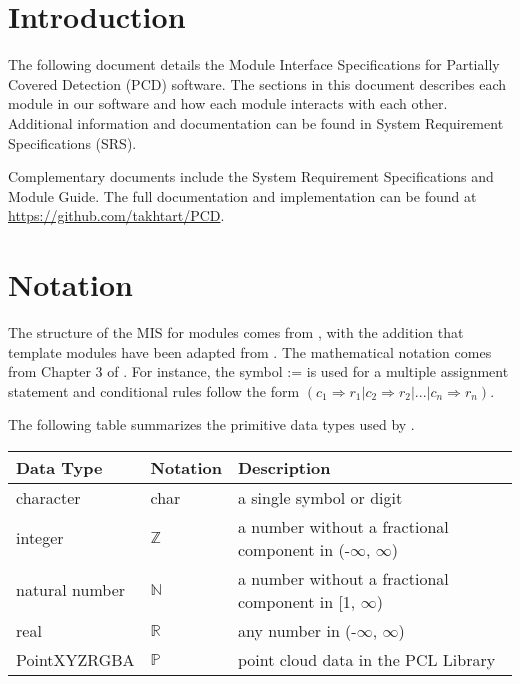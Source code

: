 \documentclass[12pt, titlepage]{article}
\begin{document}
\section{Introduction}

The following document details the Module Interface Specifications for Partially Covered Detection (PCD) software. 
The sections in this document describes each module in our software and how each module interacts with each other. 
Additional information and documentation can be found in System Requirement Specifications (SRS).

Complementary documents include the System Requirement Specifications
and Module Guide.  The full documentation and implementation can be
found at \url{https://github.com/takhtart/PCD}. 

\section{Notation}

The structure of the MIS for modules comes from \citet{HoffmanAndStrooper1995},
with the addition that template modules have been adapted from
\cite{GhezziEtAl2003}.  The mathematical notation comes from Chapter 3 of
\citet{HoffmanAndStrooper1995}.  For instance, the symbol := is used for a
multiple assignment statement and conditional rules follow the form $(c_1
\Rightarrow r_1 | c_2 \Rightarrow r_2 | ... | c_n \Rightarrow r_n )$.

The following table summarizes the primitive data types used by \progname. 

\begin{center}
\renewcommand{\arraystretch}{1.2}
\noindent 
\begin{tabular}{l l p{7.5cm}} 
\toprule 
\textbf{Data Type} & \textbf{Notation} & \textbf{Description}\\ 
\midrule
character & char & a single symbol or digit\\
integer & $\mathbb{Z}$ & a number without a fractional component in (-$\infty$, $\infty$) \\
natural number & $\mathbb{N}$ & a number without a fractional component in [1, $\infty$) \\
real & $\mathbb{R}$ & any number in (-$\infty$, $\infty$)\\
PointXYZRGBA & $\mathbb{P}$ & point cloud data in the PCL Library\\
\bottomrule
\end{tabular} 
\end{center}
\end{document}
